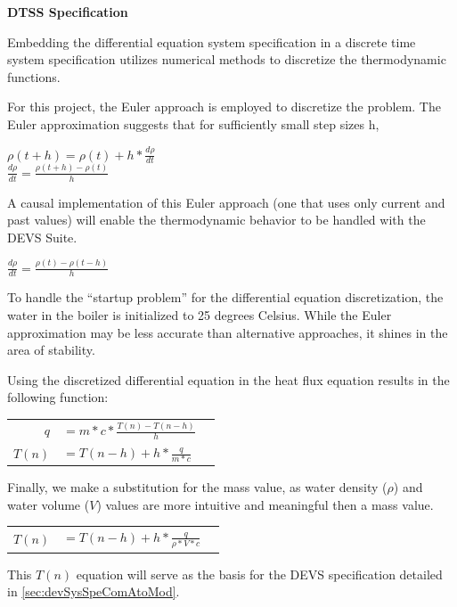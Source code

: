\documentclass[10pt]{article}
\begin{document}
\textbf{DTSS Specification}

Embedding the differential equation system specification in a discrete time system specification utilizes numerical methods to discretize the thermodynamic functions.  

For this project, the Euler approach is employed to discretize the problem.  The Euler approximation suggests that for sufficiently small step sizes h,
\begin{center}
  $\rho(t+h)=\rho(t)+h*\frac{d\rho}{dt}$ \\
  $\frac{d\rho}{dt}=\frac{\rho(t+h)-\rho(t)}{h}$ \\
\end{center}
A causal implementation of this Euler approach (one that uses only current and past values) will enable the thermodynamic behavior to be handled with the DEVS Suite.
\begin{center}
  $\frac{d\rho}{dt}=\frac{\rho(t)-\rho(t-h)}{h}$ \\
\end{center}

To handle the ``startup problem'' for the differential equation discretization, the water in the boiler is initialized to 25 degrees Celsius.  While the Euler approximation may be less accurate than alternative approaches, it shines in the area of stability.  

Using the discretized differential equation in the heat flux equation results in the following function:
\begin{center}
  \begin{tabular}{r l l}
    $q$ & $=m*c*\frac{T(n)-T(n-h)}{h}$ \\
    $T(n)$ & $=T(n-h)+h*\frac{q}{m*c}$ \\
  \end{tabular}
\end{center}
Finally, we make a substitution for the mass value, as water density ($\rho$) and water volume ($V$) values are more intuitive and meaningful then a mass value.
\begin{center}
  \begin{tabular}{r l l}
    $T(n)$ & $=T(n-h)+h*\frac{q}{\rho*V*c}$ \\
  \end{tabular}
\end{center}
This $T(n)$ equation will serve as the basis for the DEVS specification detailed in \ref{sec:devSysSpeComAtoMod}.



\end{document}
